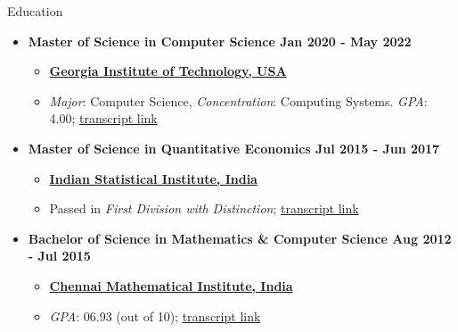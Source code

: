 \documentclass[]{mcdowellcv}
\begin{document}
\begin{cvsection}{Education}
  \hfill
  \begin{itemize}
    \item
          \textbf{Master of Science in Computer Science \hfill Jan 2020 - May 2022}
          \begin{itemize}
            \item
                  \textbf{\href{https://www.gatech.edu/}{Georgia Institute of Technology, USA}}
            \item
                  \textit{Major}: Computer Science, \textit{Concentration}:
                  Computing Systems. \textit{GPA}: 4.00;
                  \href{https://drive.google.com/file/d/1rG1vO2I3fK_aVtkboU8p6I_6vYUQBlf9/view?usp=sharing}{transcript
                  link}
          \end{itemize}
    \item
          \textbf{Master of Science in Quantitative Economics \hfill Jul 2015 - Jun 2017}
          \begin{itemize}
            \item
                  \textbf{\href{https://www.isical.ac.in/}{Indian Statistical Institute, India}}
            \item
                  Passed in \textit{First Division with Distinction};
                  \href{https://drive.google.com/file/d/1b0q9SZj-vi8_KwSI1X1aQ1qtAroeXgw0/view?usp=sharing}{transcript link}
          \end{itemize}
    \item
          \textbf{Bachelor of Science in Mathematics \& Computer Science \hfill Aug 2012 - Jul 2015}
          \begin{itemize}
            \item
                  \textbf{\href{https://www.cmi.ac.in/}{Chennai Mathematical Institute, India}}
            \item
                  \textit{GPA}: 06.93 (out of 10);
                  \href{https://drive.google.com/file/d/1azLzpG9HNLKuCWK21QHGjXc02za2fGW3/view?usp=sharing}{transcript
                  link}
          \end{itemize}
  \end{itemize}
\end{cvsection}
\end{document}
